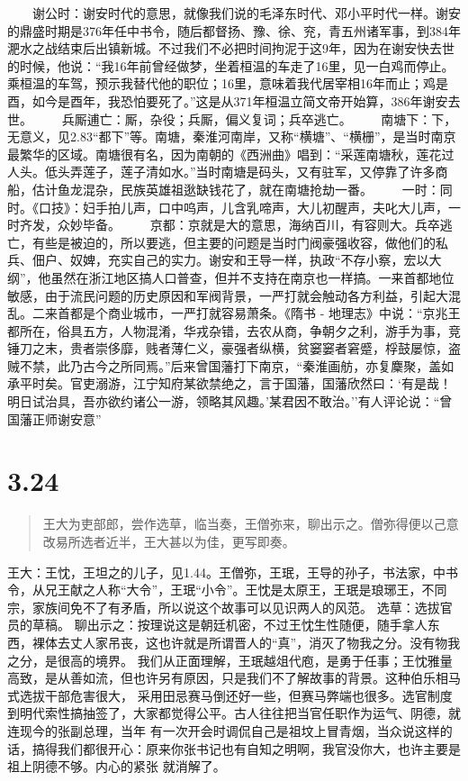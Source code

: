 \documentclass[]{book}
\begin{document}
　　谢公时：谢安时代的意思，就像我们说的毛泽东时代、邓小平时代一样。谢安的鼎盛时期是376年任中书令，随后都督扬、豫、徐、兖，青五州诸军事，到384年淝水之战结束后出镇新城。不过我们不必把时间拘泥于这9年，因为在谢安快去世的时候，他说：``我16年前曾经做梦，坐着桓温的车走了16里，见一白鸡而停止。乘桓温的车驾，预示我替代他的职位；16里，意味着我代居宰相16年而止；鸡是酉，如今是酉年，我恐怕要死了。''这是从371年桓温立简文帝开始算，386年谢安去世。
　　兵厮逋亡：厮，杂役；兵厮，偏义复词；兵卒逃亡。
　　南塘下：下，无意义，见2.83``都下''等。南塘，秦淮河南岸，又称``横塘''、``横栅''，是当时南京最繁华的区域。南塘很有名，因为南朝的《西洲曲》唱到：``采莲南塘秋，莲花过人头。低头弄莲子，莲子清如水。''当时南塘是码头，又有驻军，又停靠了许多商船，估计鱼龙混杂，民族英雄祖逖缺钱花了，就在南塘抢劫一番。
　　一时：同时。《口技》：妇手拍儿声，口中呜声，儿含乳啼声，大儿初醒声，夫叱大儿声，一时齐发，众妙毕备。
　　京都：京就是大的意思，海纳百川，有容则大。兵卒逃亡，有些是被迫的，所以要逃，但主要的问题是当时门阀豪强收容，做他们的私兵、佃户、奴婢，充实自己的实力。谢安和王导一样，执政``不存小察，宏以大纲''，他虽然在浙江地区搞人口普查，但并不支持在南京也一样搞。一来首都地位敏感，由于流民问题的历史原因和军阀背景，一严打就会触动各方利益，引起大混乱。二来首都是个商业城市，一严打就容易萧条。《隋书
-
地理志》中说：``京兆王都所在，俗具五方，人物混淆，华戎杂错，去农从商，争朝夕之利，游手为事，竞锤刀之末，贵者崇侈靡，贱者薄仁义，豪强者纵横，贫窭窭者窘蹙，桴鼓屡惊，盗贼不禁，此乃古今之所同焉。''后来曾国藩打下南京，``秦淮画舫，亦复麇聚，盖如承平时矣。官吏溺游，江宁知府某欲禁绝之，言于国藩，国藩欣然曰：`有是哉！明日试治具，吾亦欲约诸公一游，领略其风趣。'某君因不敢治。''有人评论说：``曾国藩正师谢安意''

\section{3.24}\label{section-178}

\begin{quote}
王大为吏部郎，尝作选草，临当奏，王僧弥来，聊出示之。僧弥得便以己意改易所选者近半，王大甚以为佳，更写即奏。
\end{quote}

王大：王忱，王坦之的儿子，见1.44。王僧弥，王珉，王导的孙子，书法家，中书令，从兄王献之人称``大令''，王珉``小令''。王忱是太原王，王珉是琅琊王，不同宗，家族间免不了有矛盾，所以说这个故事可以见识两人的风范。
选草：选拔官员的草稿。
聊出示之：按理说这是朝廷机密，不过王忱生性随便，随手拿人东西，裸体去丈人家吊丧，这也许就是所谓晋人的``真''，消灭了物我之分。没有物我之分，是很高的境界。
我们从正面理解，王珉越俎代庖，是勇于任事；王忱雅量高致，是从善如流，但也许另有原因，只是我们不了解故事的背景。这种伯乐相马式选拔干部危害很大，
采用田忌赛马倒还好一些，但赛马弊端也很多。选官制度到明代索性搞抽签了，大家都觉得公平。古人往往把当官任职作为运气、阴德，就连现今的张副总理，当年
有一次开会时调侃自己是祖坟上冒青烟，当众说这样的话，搞得我们都很开心：原来你张书记也有自知之明啊，我官没你大，也许主要是祖上阴德不够。内心的紧张
就消解了。
\end{document}
